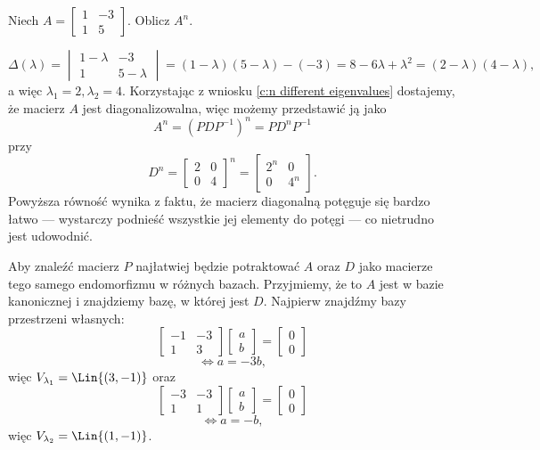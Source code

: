 \begin{example}
    Niech $A = \begin{bmatrix}
        1 & -3 \\
        1 & 5
    \end{bmatrix}$. Oblicz $A^n$.
\end{example}
\begin{solution}
    \[ \Delta(\lambda) = \begin{vmatrix}
        1 - \lambda & -3 \\
        1 & 5 - \lambda
    \end{vmatrix} = (1-\lambda)(5-\lambda) - (-3) = 8 - 6\lambda + \lambda^2 = (2 - \lambda)(4 - \lambda), \]
    a więc $\lambda_1 = 2, \lambda_2 = 4$. Korzystając z wniosku \ref{c:n different eigenvalues} dostajemy, że macierz $A$ jest diagonalizowalna, więc możemy przedstawić ją jako
    \[ A^n = (PDP^{-1})^n = PD^nP^{-1} \]
    przy
    \[ D^n = \begin{bmatrix}
        2 & 0 \\
        0 & 4
    \end{bmatrix}^n = \begin{bmatrix}
        2^n & 0 \\
        0 & 4^n
    \end{bmatrix}. \]
    Powyższa równość wynika z faktu, że macierz diagonalną potęguje się bardzo łatwo --- wystarczy podnieść wszystkie jej elementy do potęgi --- co nietrudno jest udowodnić.

    Aby znaleźć macierz $P$ najłatwiej będzie potraktować $A$ oraz $D$ jako macierze tego samego endomorfizmu w różnych bazach. Przyjmiemy, że to $A$ jest w bazie kanonicznej i znajdziemy bazę, w której jest $D$. Najpierw znajdźmy bazy przestrzeni własnych:
    \[ \begin{bmatrix}
        -1 & -3 \\
        1 & 3
    \end{bmatrix}\begin{bmatrix}
        a \\ b
    \end{bmatrix} = \begin{bmatrix}
        0 \\ 0
    \end{bmatrix} \]
    \[ \iff a = -3b, \]
    więc $V_{\lambda_1} = \Lin\{(3, -1)\}$ oraz
    \[ \begin{bmatrix}
        -3 & -3 \\
        1 & 1
    \end{bmatrix}\begin{bmatrix}
        a \\ b
    \end{bmatrix} = \begin{bmatrix}
        0 \\ 0
    \end{bmatrix} \]
    \[ \iff a = -b, \]
    więc $V_{\lambda_2} = \Lin\{(1, -1)\}$.


\end{solution}
